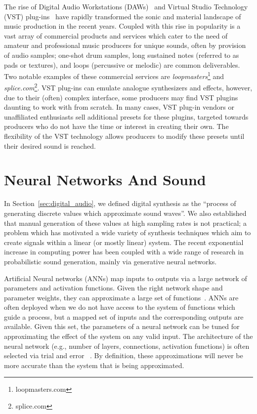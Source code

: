 \documentclass[\main/thesis.tex]{subfiles}
\begin{document}
 The rise of Digital Audio Workstations (DAWs)~\cite{leider2004digital} and Virtual Studio Technology (VST) plug-ins~\cite{tanev2013virtual} have rapidly transformed the sonic and material landscape of music production in the recent years. Coupled with this rise in popularity is a vast array of commercial products and services which cater to the need of amateur and professional music producers for unique sounds, often by provision of audio samples; one-shot drum samples, long sustained notes (referred to as pads or textures), and loops (percussive or melodic) are common deliverables. Two notable examples of these commercial services are \textit{loopmasters}\footnote{loopmasters.com} and \textit{splice.com}\footnote{splice.com}. VST plug-ins can emulate analogue synthesizers and effects,  however,  due to their (often) complex interface, some producers may find VST plugins daunting to work with from scratch. In many cases, VST plug-in vendors or unaffiliated enthusiasts sell additional presets for these plugins, targeted towards producers who do not have the time or interest in creating their own. The flexibility of the VST technology allows producers to modify these presets until their desired sound is reached.
 
\section{Neural Networks And Sound}
\label{bg:NN}
In Section~\ref{sec:digital_audio}, we defined digital synthesis as the \enquote{process of generating discrete values which approximate sound waves}. We also established that manual generation of these values at high sampling rates is not practical; a problem which has motivated a wide variety of synthesis techniques which aim to create signals within a linear (or mostly linear) system. The recent exponential increase in computing power has been coupled with a wide range of research in probabilistic sound generation, mainly via generative neural networks. 

Artificial Neural networks (ANNs) map inputs to outputs via a large network of parameters and activation functions. Given the right network shape and parameter weights, they can approximate a large set of functions~\cite{cybenko1989approximation,cardaliaguet1992approximation}. ANNs are often deployed when we do not have access to the system of functions which guide a process, but a mapped set of inputs and the corresponding outputs are available. Given this set, the parameters of a neural network can be tuned for approximating the effect of the system on any valid input. The architecture of the neural network (e.g., number of layers, connections, activation functions) is often selected via trial and error ~\cite{bergstra2012random,bergstra2011algorithms,ba2013adaptive}. By definition, these approximations will never be more accurate than the system that is being approximated. 
\end{document}
